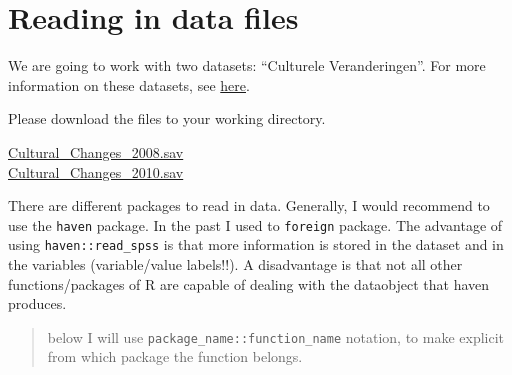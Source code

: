 \documentclass[
]{book}
\begin{document}
\hypertarget{reading-in-data-files}{%
\section{Reading in data files}\label{reading-in-data-files}}

We are going to work with two datasets: ``Culturele Veranderingen''. For more information on these datasets, see \href{https://www.scp.nl/Onderzoek/Bronnen/Beknopte_onderzoeksbeschrijvingen/Culturele_veranderingen_in_Nederland_CV}{here}.

Please download the files to your working directory.

\href{\%22addfiles/Cultural_Changes_2008.sav\%22}{Cultural\_Changes\_2008.sav}\\
\href{\%22addfiles/Cultural_Changes_2008.sav\%22}{Cultural\_Changes\_2010.sav} ~

There are different packages to read in data. Generally, I would recommend to use the \texttt{haven} package. In the past I used to \texttt{foreign} package. The advantage of using \texttt{haven::read\_spss} is that more information is stored in the dataset and in the variables (variable/value labels!!). A disadvantage is that not all other functions/packages of R are capable of dealing with the dataobject that haven produces.

\begin{quote}
below I will use \texttt{package\_name::function\_name} notation, to make explicit from which package the function belongs.
\end{quote}
\end{document}
